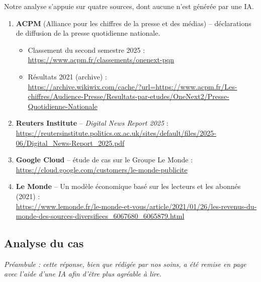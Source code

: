 \documentclass[a4paper,12pt]{article}
\begin{document}
Notre analyse s'appuie sur quatre sources, dont aucune n'est générée par une IA.

\begin{enumerate}
  \item \textbf{ACPM} (Alliance pour les chiffres de la presse et des médias) --
        déclarations de diffusion de la presse quotidienne nationale.
  \begin{itemize}
    \item Classement du second semestre 2025 :\\
          {\footnotesize\url{https://www.acpm.fr/classements/onenext-pqn}}
    \item Résultats 2021 (archive) :\\
          {\footnotesize\url{https://archive.wikiwix.com/cache/?url=https://www.acpm.fr/Les-chiffres/Audience-Presse/Resultats-par-etudes/OneNext2/Presse-Quotidienne-Nationale}}
  \end{itemize}

  \item \textbf{Reuters Institute} -- \emph{Digital News Report 2025} :\\
        {\footnotesize\url{https://reutersinstitute.politics.ox.ac.uk/sites/default/files/2025-06/Digital_News-Report_2025.pdf}}

  \item \textbf{Google Cloud} -- étude de cas sur le Groupe Le Monde :\\
        {\footnotesize\url{https://cloud.google.com/customers/le-monde-publicite}}

  \item \textbf{Le Monde} -- \og Un modèle économique basé sur les lecteurs
        et les abonnés \fg{} (2021) :\\
        {\footnotesize\url{https://www.lemonde.fr/le-monde-et-vous/article/2021/01/26/les-revenus-du-monde-des-sources-diversifiees_6067680_6065879.html}}
\end{enumerate}

\subsection{Analyse du cas}

\noindent\emph{Préambule : cette réponse, bien que rédigée par nos soins,
a été remise en page avec l'aide d'une IA afin d'être plus agréable à lire.}
\end{document}
